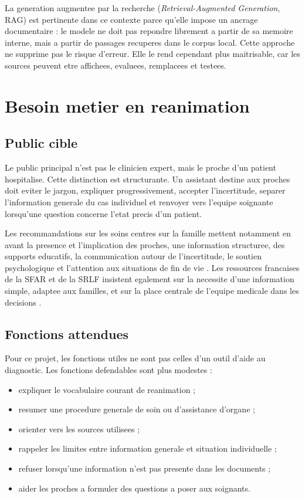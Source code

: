 \documentclass[11pt,a4paper]{article}
\begin{document}
La generation augmentee par la recherche (\emph{Retrieval-Augmented Generation}, RAG) est pertinente dans ce contexte parce qu'elle impose un ancrage documentaire : le modele ne doit pas repondre librement a partir de sa memoire interne, mais a partir de passages recuperes dans le corpus local. Cette approche ne supprime pas le risque d'erreur. Elle le rend cependant plus maitrisable, car les sources peuvent etre affichees, evaluees, remplacees et testees.

\section{Besoin metier en reanimation}

\subsection{Public cible}

Le public principal n'est pas le clinicien expert, mais le proche d'un patient hospitalise. Cette distinction est structurante. Un assistant destine aux proches doit eviter le jargon, expliquer progressivement, accepter l'incertitude, separer l'information generale du cas individuel et renvoyer vers l'equipe soignante lorsqu'une question concerne l'etat precis d'un patient.

Les recommandations sur les soins centres sur la famille mettent notamment en avant la presence et l'implication des proches, une information structuree, des supports educatifs, la communication autour de l'incertitude, le soutien psychologique et l'attention aux situations de fin de vie \autocite{sccmFamilyCentered2024}. Les ressources francaises de la SFAR et de la SRLF insistent egalement sur la necessite d'une information simple, adaptee aux familles, et sur la place centrale de l'equipe medicale dans les decisions \autocite{sfarInfoPatientsRea,srlfVisitesProches}.

\subsection{Fonctions attendues}

Pour ce projet, les fonctions utiles ne sont pas celles d'un outil d'aide au diagnostic. Les fonctions defendables sont plus modestes :

\begin{itemize}
  \item expliquer le vocabulaire courant de reanimation ;
  \item resumer une procedure generale de soin ou d'assistance d'organe ;
  \item orienter vers les sources utilisees ;
  \item rappeler les limites entre information generale et situation individuelle ;
  \item refuser lorsqu'une information n'est pas presente dans les documents ;
  \item aider les proches a formuler des questions a poser aux soignants.
\end{itemize}
\end{document}
